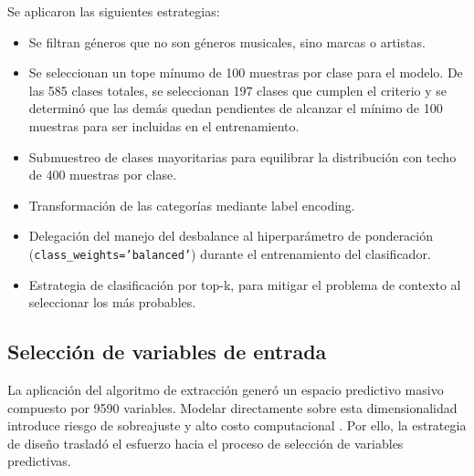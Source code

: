 Se aplicaron las siguientes estrategias:
\begin{itemize}
    \item Se filtran géneros que no son géneros musicales, sino marcas o artistas.
    \item Se seleccionan un tope mínumo de 100 muestras por clase para el modelo. De las 585 clases totales, se seleccionan 197 clases que cumplen el criterio y se determinó que las demás quedan pendientes de alcanzar el mínimo de 100 muestras para ser incluidas en el entrenamiento.
    \item Submuestreo de clases mayoritarias para equilibrar la distribución con techo de 400 muestras por clase. 
    \item Transformación de las categorías mediante label encoding.
    \item Delegación del manejo del desbalance al hiperparámetro de ponderación (\texttt{class\_weights='balanced'}) durante el entrenamiento del clasificador.
    \item Estrategia de clasificación por top-k, para mitigar el problema de contexto al seleccionar los más probables.
\end{itemize}



\subsection{Selección de variables de entrada}
\label{sec:seleccion_variables}

La aplicación del algoritmo de extracción generó un espacio predictivo masivo compuesto por 9590 variables. Modelar directamente sobre esta dimensionalidad introduce riesgo de sobreajuste y alto costo computacional \citep{hastie2009elements, bishop2006pattern}. Por ello, la estrategia de diseño trasladó el esfuerzo hacia el proceso de selección de variables predictivas.

